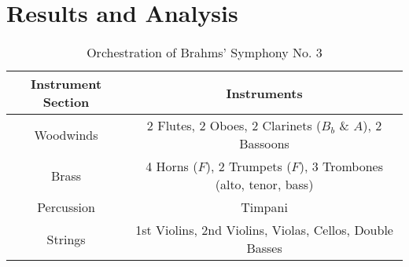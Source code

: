 \section{Results and Analysis}\label{Sec: Results and Analysis}

\lipsum[1]

\begin{table}[h]
    \centering
    \begin{tabular}{|c|c|}
        \hline
        \textbf{Instrument Section} & \textbf{Instruments} \\
        \hline
        Woodwinds & 2 Flutes, 2 Oboes, 2 Clarinets ($B_b$ \& $A$), 2 Bassoons \\
        \hline
        Brass & 4 Horns ($F$), 2 Trumpets ($F$), 3 Trombones (alto, tenor, bass) \\
        \hline
        Percussion & Timpani \\
        \hline
        Strings & 1st Violins, 2nd Violins, Violas, Cellos, Double Basses \\
        \hline
    \end{tabular}
    \caption{Orchestration of Brahms' Symphony No. 3}
    \label{tab: Brahms}
\end{table}

\lipsum[2]
